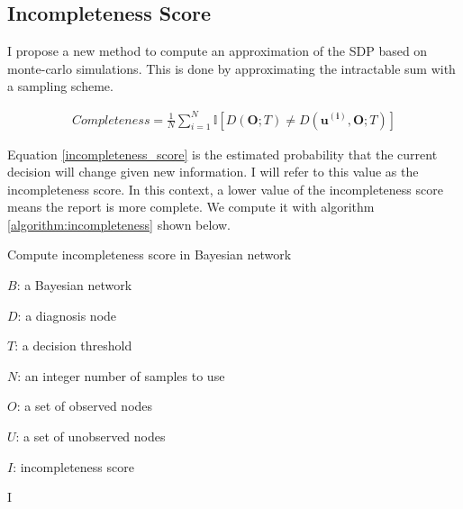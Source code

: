 \subsection{Incompleteness Score}
I propose a new method to compute an approximation of the SDP based on monte-carlo simulations. This is done by approximating the intractable sum with a sampling scheme.

\begin{align}
\label{incompleteness_score}
Completeness = \frac{1}{N}\sum_{i =1 }^{N}\mathbb{I}\left[D(\mathbf{O};T) \neq D(\mathbf{u^{(i)}},\mathbf{O};T)\right]
\end{align}

Equation \ref{incompleteness_score} is the estimated probability that the current decision will change given new information. I will refer to this value as the incompleteness score. In this context, a lower value of the incompleteness score means the report is more complete. We compute it with algorithm \ref{algorithm:incompleteness} shown below.


\begin{algorithm}[h]
	\caption{Compute incompleteness score in Bayesian network}
	\label{algorithm:incompleteness}
	\begin{algorithmic}
		\Require
		
		$ B $: a Bayesian network
		
		$ D $: a diagnosis node
		
		$ T $: a decision threshold
		
		$ N $: an integer number of samples to use
		
		$ O $: a set of observed nodes
		
		$ U $: a set of unobserved nodes
		
		\Ensure $ I $: incompleteness score
		
		
		
		
			
			
			\EndIf
		\EndFor
		\State \Return I
		\EndFunction
		
	\end{algorithmic}
\end{algorithm}



